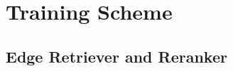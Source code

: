 





\section{Training Scheme}
\label{sec:training_scheme}

\subsection{Edge Retriever and Reranker}
\label{sec:edge_retriever_and_reranker}


